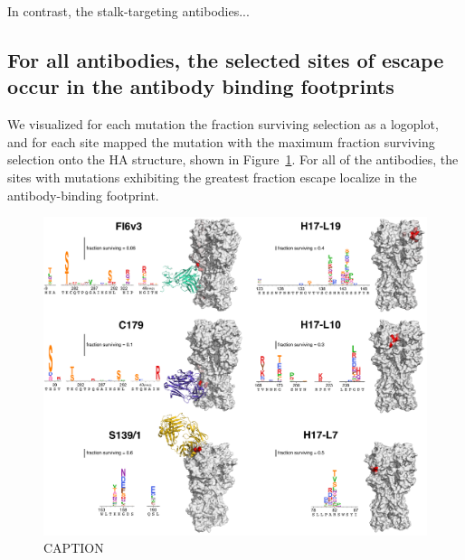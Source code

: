 \documentclass[11pt]{article}
\begin{document}
In contrast, the stalk-targeting antibodies...

\subsection*{For all antibodies, the selected sites of escape occur in the antibody binding footprints}
We visualized for each mutation the fraction surviving selection as a logoplot, and for each site mapped the mutation with the maximum fraction surviving selection onto the HA structure, shown in Figure~\ref{fig:structures}. 
For all of the antibodies, the sites with mutations exhibiting the greatest fraction escape localize in the antibody-binding footprint.


\begin{figure}
\centerline{\includegraphics[width=\textwidth]{figs/logoplots_pymol/logoplots_pymol.pdf}}
\caption{
\label{fig:structures}
CAPTION
}
\end{figure}
\end{document}
